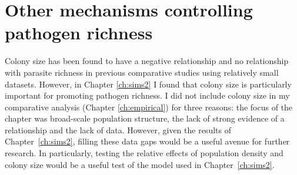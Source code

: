 \section{Other mechanisms controlling pathogen richness}

Colony size has been found to have a negative relationship \cite{gay2014parasite} and no relationship \cite{turmelle2009correlates} with parasite richness in previous comparative studies using relatively small datasets.
However, in Chapter \ref{ch:sims2} I found that colony size is particularly important for promoting pathogen richness.
I did not include colony size in my comparative analysis (Chapter \ref{ch:empirical}) for three reasons: the focus of the chapter was broad-scale population structure, the lack of strong evidence of a relationship \cite{turmelle2009correlates} and the lack of data.
However, given the results of Chapter~\ref{ch:sims2}, filling these data gaps would be a useful avenue for further research.
In particularly, testing the relative effects of population density and colony size would be a useful test of the model used in Chapter~\ref{ch:sims2}.

